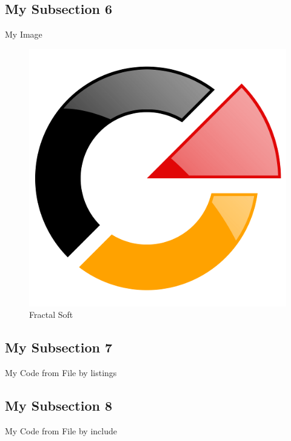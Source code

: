 \documentclass[12pt]{beamer}
\begin{document}
\subsection{My Subsection 6}
\begin{frame}
  \begin{block}{My Image}
    \begin{figure}
      \centering
      \includegraphics{images/fractalsoft-logotype.png}
      \caption{Fractal Soft}
    \end{figure}
  \end{block}
\end{frame}

\subsection{My Subsection 7}
\begin{frame}
  \begin{block}{My Code from File by listings}
    
  \end{block}
\end{frame}

\subsection{My Subsection 8}
\begin{frame}
  \begin{block}{My Code from File by include}
    
  \end{block}
\end{frame}
\end{document}
